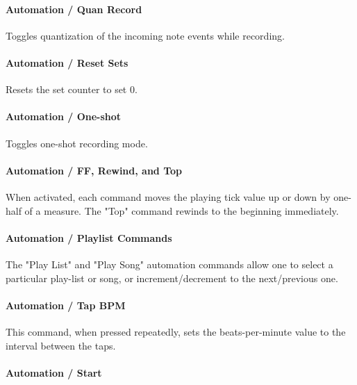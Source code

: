 \paragraph{Automation / Quan Record}
\label{paragraph:configuration_midi_quanrecord}

   Toggles quantization of the incoming note events while recording.

\paragraph{Automation / Reset Sets}
\label{paragraph:configuration_midi_reset_sets}

   Resets the set counter to set 0.

\paragraph{Automation / One-shot}
\label{paragraph:configuration_midi_one_shot}

   Toggles one-shot recording mode.

\paragraph{Automation / FF, Rewind, and Top}
\label{paragraph:configuration_midi_ff_rewind_top}

   When activated, each command moves the playing tick value up or down
   by one-half of a measure.
   The "Top" command rewinds to the beginning immediately.

\paragraph{Automation / Playlist Commands}
\label{paragraph:configuration_midi_playlist_commands}

   The "Play List" and "Play Song" automation commands allow one
   to select a particular play-list or song,
   or increment/decrement to the next/previous one.

\paragraph{Automation / Tap BPM}
\label{paragraph:configuration_midi_tap_bpm}

   This command, when pressed repeatedly, sets the beats-per-minute
   value to the interval between the taps.

\paragraph{Automation / Start}
\label{paragraph:configuration_start}

